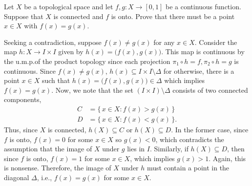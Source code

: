 \begin{problem}
  Let \(X\) be a topological space and let \(f,g\colon X\to[0,1]\) be a
  continuous function. Suppose that \(X\) is connected and \(f\) is
  onto. Prove that there must be a point \(x\in X\) with \(f(x)=g(x)\).
\end{problem}
\begin{solution}
  Seeking a contradiction, suppose \(f(x)\neq g(x)\) for any \(x\in
  X\). Consider the map \(h\colon X\to I\times I\) given by
  \(h(x)=\bigl(f(x),g(x)\bigr)\). This map is continuous by the u.m.p.\@ of
  the product topology since each projection
  \(\pi_1\circ h=f,\pi_2\circ h=g\) is continuous. Since \(f(x)\neq g(x)\),
  \(h(x)\subseteq I\times I\setminus\Delta\) for otherwise, there is a
  point \(x\in X\) such that \(h(x)=\bigl(f(x),g(x)\bigr)\in\Delta\) which
  implies \(f(x)=g(x)\). Now, we note that the set
  \((I\times I)\setminus\Delta\) consists of two connected components,
  \begin{align*}
    C&=\bigl\{\,x\in X:f(x)>g(x)\,\bigr\}\\
    D&=\bigl\{\,x\in X:f(x)<g(x)\,\bigr\}.
  \end{align*}
  Thus, since \(X\) is connected, \(h(X)\subseteq C\) or \(h(X)\subseteq
  D\). In the former case, since \(f\) is onto, \(f(x)=0\) for some \(x\in
  X\) so \(g(x)<0\), which contradicts the assumption that the image of
  \(X\) under \(g\) lies in \(I\). Similarly, if \(h(X)\subseteq D\), then
  since \(f\) is onto, \(f(x)=1\) for some \(x\in X\), which implies
  \(g(x)>1\). Again, this is nonsense. Therefore, the image of \(X\) under
  \(h\) must contain a point in the diagonal \(\Delta\), i.e.,
  \(f(x)=g(x)\) for some \(x\in X\).
\end{solution}

